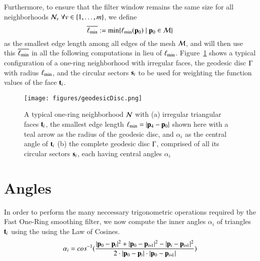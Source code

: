 Furthermore, to ensure that the filter window remains the same size for all neighborhoods $\mathcal{N}_v\;\forall v \in \{1,\ldots,m\}$, we define
\begin{equation}
	\overline{\ell_\text{min}} := \min\{\ell_\text{min}(\mathbf{p}_0) \;|\; \mathbf{p}_0 \in \mathcal{M}\}
	\label{eq:globalMinimumEdgeLength}
\end{equation}%
%
as the smallest edge length among all edges of the mesh $\mathcal{M}$, and will then use this $\overline{\ell_\text{min}}$ in all the following computations in lieu of $\ell_\text{min}$.
%
Figure~\ref{fig:geodesicDisc} shows a typical configuration of a one-ring neighborhood with irregular faces, the geodesic disc $\Gamma$ with radius $\ell_\text{min}$, and the circular sectors $\mathbf{s}_i$ to be used for weighting the function values of the face $\mathbf{t}_i$.
\begin{figure}[ht]
\ffigbox
	{\texttt{[image: figures/geodesicDisc.png]}}
	{\caption[One-ring and geodesic disc]{A typical one-ring neighborhood $\mathcal{N}$ with (a) irregular triangular faces $\mathbf{t}_i$, the smallest edge length $\ell_\text{min} = |\mathbf{p}_4 - \mathbf{p}_0|$ shown here with a teal arrow as the radius of the geodesic disc, and $\alpha_i$ as the central angle of $\mathbf{t}_i$ (b) the complete geodesic disc $\Gamma$, comprised of all its circular sectors $\mathbf{s}_i$, each having central angles $\alpha_i$}\label{fig:geodesicDisc}}
\end{figure}%
%
%
%
%
%
%
%
\section{Angles}
\label{ch4sA}
In order to perform the many neccessary trigonometric operations required by the Fast One-Ring smoothing filter, we now compute the inner angles $\alpha_i$ of triangles $\mathbf{t}_i$ using the using the Law of Cosines. 
\begin{equation}
	\alpha_i = cos^{-1}(\frac{|\bp_0 - \bp_{i}|^2 + |\bp_0 - \bp_{\sipo}|^2 - |\bp_i - \bp_{\sipo}|^2}{2\cdot|\bp_0 - \bp_{i}|\cdot|\bp_0 - \bp_{\sipo}|})
	\label{eq:alphaFromEdgeLengths}
\end{equation}%
%


